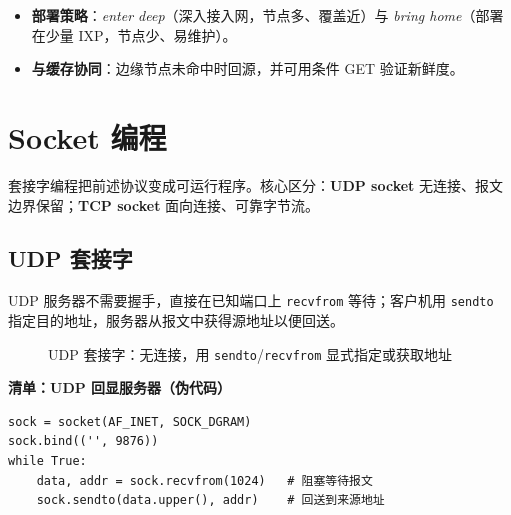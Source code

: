 \begin{itemize}
    \item \textbf{部署策略}：\textit{enter deep}（深入接入网，节点多、覆盖近）与 \textit{bring home}（部署在少量 IXP，节点少、易维护）。
    \item \textbf{与缓存协同}：边缘节点未命中时回源，并可用条件 GET 验证新鲜度。
\end{itemize}

\section{Socket 编程}

套接字编程把前述协议变成可运行程序。核心区分：\textbf{UDP socket} 无连接、报文边界保留；\textbf{TCP socket} 面向连接、可靠字节流。

\subsection{UDP 套接字}

UDP 服务器不需要握手，直接在已知端口上 \texttt{recvfrom} 等待；客户机用 \texttt{sendto} 指定目的地址，服务器从报文中获得源地址以便回送。

\begin{figure}[H]
\centering
{}
\caption{UDP 套接字：无连接，用 \texttt{sendto}/\texttt{recvfrom} 显式指定或获取地址}
\label{fig:socket_udp}
\end{figure}

\noindent\textbf{清单：UDP 回显服务器（伪代码）}
\begin{lstlisting}
sock = socket(AF_INET, SOCK_DGRAM)
sock.bind(('', 9876))
while True:
    data, addr = sock.recvfrom(1024)   # 阻塞等待报文
    sock.sendto(data.upper(), addr)    # 回送到来源地址
\end{lstlisting}

